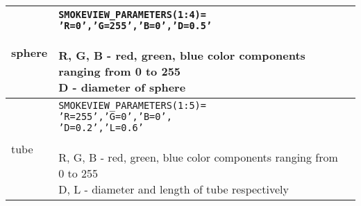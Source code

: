 \begin{longtable}[ht]{|l|l|c|}
sphere&
\parbox[c]{\boxwidth}{
{\tt SMOKEVIEW\_PARAMETERS(1:4)=}\\
{\tt 'R=0','G=255','B=0','D=0.5'}\\ \\
R, G, B - red, green, blue color components ranging from 0 to 255\\
D - diameter of sphere
} &
 \\ \hline

tube&
\parbox[c]{\boxwidth}{
{\tt SMOKEVIEW\_PARAMETERS(1:5)=}\\
{\tt 'R=255','G=0','B=0',}\\
{\tt 'D=0.2','L=0.6'}\\ \\
R, G, B - red, green, blue color components ranging from 0 to 255\\
D, L - diameter and length of tube respectively
} &
 \\ \hline


\end{longtable} 